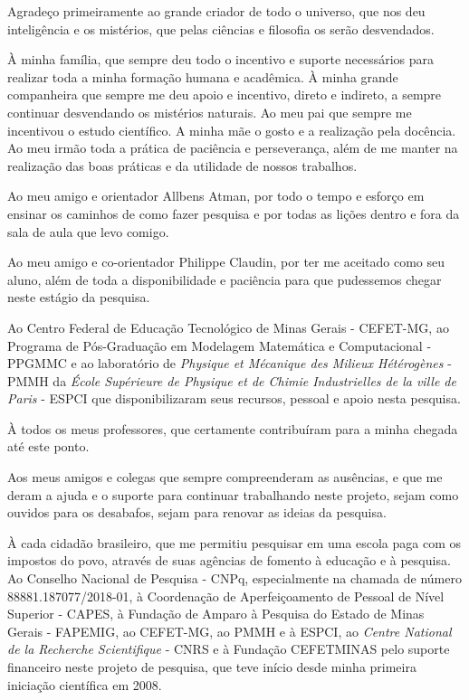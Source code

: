 \begin{agradecimentos}[Acknowledgements]

\newpage

Agradeço primeiramente ao grande criador de todo o universo, que nos deu inteligência e os mistérios, que pelas ciências e filosofia os serão desvendados.

À minha família, que sempre deu todo o incentivo e suporte necessários para realizar toda a minha formação humana e acadêmica. À minha grande companheira que sempre me deu apoio e incentivo, direto e indireto, a sempre continuar desvendando os mistérios naturais. Ao meu pai que sempre me incentivou o estudo científico. A minha mãe o gosto e a realização pela docência. Ao meu irmão toda a prática de paciência e perseverança, além de me manter na realização das boas práticas e da utilidade de nossos trabalhos.

Ao meu amigo e orientador Allbens Atman, por todo o tempo e esforço em ensinar os caminhos de como fazer pesquisa e por todas as lições dentro e fora da sala de aula que levo comigo.

Ao meu amigo e co-orientador Philippe Claudin, por ter me aceitado como seu aluno, além de toda a disponibilidade e paciência para que pudessemos chegar neste estágio da pesquisa.

Ao Centro Federal de Educação Tecnológico de Minas Gerais - CEFET-MG, ao Programa de Pós-Graduação em Modelagem Matemática e Computacional - PPGMMC e ao laboratório de \textit{Physique et Mécanique des Milieux Hétérogènes} - PMMH da \textit{École Supérieure de Physique et de Chimie Industrielles de la ville de Paris} - ESPCI que disponibilizaram seus recursos, pessoal e apoio nesta pesquisa.

À todos os meus professores, que certamente contribuíram para a minha chegada até este ponto.

Aos meus amigos e colegas que sempre compreenderam as ausências, e que me deram a ajuda e o suporte para continuar trabalhando neste projeto, sejam como ouvidos para os desabafos, sejam para renovar as ideias da pesquisa.



À cada cidadão brasileiro, que me permitiu pesquisar em uma escola paga com os impostos do povo, através de suas agências de fomento à educação e à pesquisa. Ao Conselho Nacional de Pesquisa - CNPq, especialmente na chamada de número 88881.187077/2018-01, à Coordenação de Aperfeiçoamento de Pessoal de Nível Superior - CAPES, à Fundação de Amparo à Pesquisa do Estado de Minas Gerais - FAPEMIG, ao CEFET-MG, ao PMMH e à ESPCI, ao \textit{Centre National de la Recherche Scientifique} - CNRS e à Fundação CEFETMINAS pelo suporte financeiro neste projeto de pesquisa, que teve início desde minha primeira iniciação científica em 2008.


\end{agradecimentos}
